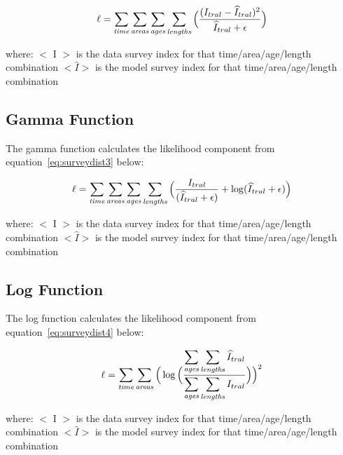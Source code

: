 \documentclass [a4paper, 10pt]{book}
\begin{document}
\begin{equation}\label{eq:surveydist2}
\ell = \sum_{\it time}\sum_{\it areas}\sum_{\it ages}\sum_{\it lengths} \Big( {\frac{ ( I_{tral} - \widehat{I}_{tral} ) ^2} {\widehat{I}_{tral} + \epsilon}} \Big)
\end{equation}

where:\newline
$<$ I $>$ is the data survey index for that time/area/age/length combination\newline
$<\widehat{I}>$ is the model survey index for that time/area/age/length combination

\subsection{Gamma Function}
The gamma function calculates the likelihood component from equation~\ref{eq:surveydist3} below:

\begin{equation}\label{eq:surveydist3}
\ell = \sum_{\it time}\sum_{\it areas}\sum_{\it ages}\sum_{\it lengths} \Big( {\frac{ I_{tral}} { (\widehat{I}_{tral} + \epsilon )} + \log ({\widehat{I}_{tral} + \epsilon}}) \Big)
\end{equation}

where:\newline
$<$ I $>$ is the data survey index for that time/area/age/length combination\newline
$<\widehat{I}>$ is the model survey index for that time/area/age/length combination

\subsection{Log Function}
The log function calculates the likelihood component from equation~\ref{eq:surveydist4} below:

\begin{equation}\label{eq:surveydist4}
\ell = \sum_{\it time}\sum_{\it areas} \Big(  \log \Big( {\frac{ \displaystyle \sum_{\it ages}\sum_{\it lengths}  \widehat{I}_{tral}} { \displaystyle \sum_{\it ages}\sum_{\it lengths} I_{tral}}} \Big) \Big) ^2
\end{equation}

where:\newline
$<$ I $>$ is the data survey index for that time/area/age/length combination\newline
$<\widehat{I}>$ is the model survey index for that time/area/age/length combination
\end{document}
